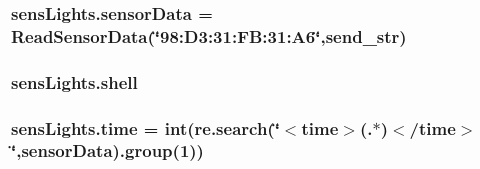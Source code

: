 \subsubsection[{\texorpdfstring{sensor\+Data}{sensorData}}]{\setlength{\rightskip}{0pt plus 5cm}sens\+Lights.\+sensor\+Data = Read\+Sensor\+Data(\char`\"{}98\+:D3\+:31\+:\+F\+B\+:31\+:\+A6\char`\"{},send\+\_\+str)}\hypertarget{namespacesensLights_a8b0ffad4098c0b49ff9ed83c3e7a279c}{}\label{namespacesensLights_a8b0ffad4098c0b49ff9ed83c3e7a279c}
\subsubsection[{\texorpdfstring{shell}{shell}}]{\setlength{\rightskip}{0pt plus 5cm}sens\+Lights.\+shell}\hypertarget{namespacesensLights_a6af9fcb7c8252a343f039e728ab218b3}{}\label{namespacesensLights_a6af9fcb7c8252a343f039e728ab218b3}
\subsubsection[{\texorpdfstring{time}{time}}]{\setlength{\rightskip}{0pt plus 5cm}sens\+Lights.\+time = int(re.\+search(\char`\"{}$<$time$>$(.$\ast$)$<$/time$>$\char`\"{},sensor\+Data).group(1))}\hypertarget{namespacesensLights_a043e829ccb1ca220d4668cdd65be4988}{}\label{namespacesensLights_a043e829ccb1ca220d4668cdd65be4988}
